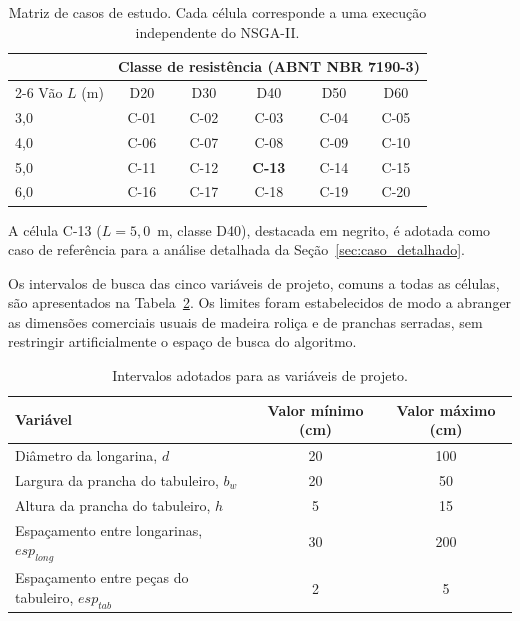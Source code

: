 \begin{table}[!ht]
\caption{Matriz de casos de estudo. Cada célula corresponde a uma execução independente do NSGA-II.\label{tab:matriz}}
\begin{threeparttable}
\begin{tabular*}{\columnwidth}{@{\extracolsep\fill}lccccc@{\extracolsep\fill}}
\toprule
 & \multicolumn{5}{c}{Classe de resistência (ABNT NBR 7190-3)} \\
\cmidrule{2-6}
Vão $L$ (m) & D20 & D30 & D40 & D50 & D60 \\
\midrule
3{,}0 & C-01 & C-02 & C-03 & C-04 & C-05 \\
4{,}0 & C-06 & C-07 & C-08 & C-09 & C-10 \\
5{,}0 & C-11 & C-12 & \textbf{C-13} & C-14 & C-15 \\
6{,}0 & C-16 & C-17 & C-18 & C-19 & C-20 \\
\bottomrule
\end{tabular*}
\begin{tablenotes}
\footnotesize
\item A célula C-13 ($L = 5{,}0$~m, classe D40), destacada em negrito, é adotada como caso de referência para a análise detalhada da Seção~\ref{sec:caso_detalhado}.
\end{tablenotes}
\end{threeparttable}
\end{table}

Os intervalos de busca das cinco variáveis de projeto, comuns a todas as células, são apresentados na Tabela~\ref{tab:intervalos}.
Os limites foram estabelecidos de modo a abranger as dimensões comerciais usuais de madeira roliça e de pranchas serradas, sem restringir artificialmente o espaço de busca do algoritmo.

\begin{table}[!ht]
\caption{Intervalos adotados para as variáveis de projeto.\label{tab:intervalos}}
\begin{threeparttable}
\begin{tabular*}{\columnwidth}{@{\extracolsep\fill}lcc@{\extracolsep\fill}}
\toprule
Variável & Valor mínimo (cm) & Valor máximo (cm) \\
\midrule
Diâmetro da longarina, $d$ & 20 & 100 \\
Largura da prancha do tabuleiro, $b_w$ & 20 & 50 \\
Altura da prancha do tabuleiro, $h$ & 5 & 15 \\
Espaçamento entre longarinas, $esp_{long}$ & 30 & 200 \\
Espaçamento entre peças do tabuleiro, $esp_{tab}$ & 2 & 5 \\
\bottomrule
\end{tabular*}
\end{threeparttable}
\end{table}


